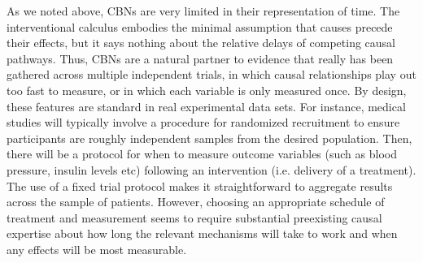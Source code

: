 \documentclass{cambridge7A}%
\begin{document}
As we noted above, CBNs are very limited in their representation of time.  The interventional calculus embodies the minimal assumption that causes precede their effects, but it says nothing about the relative delays of competing causal pathways. %
Thus, CBNs are a natural partner to evidence that really has been gathered across multiple independent trials, in which causal relationships play out too fast to measure, or in which each variable is only measured once.  By design, these features are standard in real experimental data sets.  For instance, medical studies will typically involve a procedure for randomized recruitment to ensure participants are roughly independent samples from the desired population.  Then, there will be a protocol for when to measure outcome variables (such as blood pressure, insulin levels etc) following an intervention (i.e. delivery of a treatment).  The use of a fixed trial protocol makes it straightforward to aggregate results across the sample of patients.  However, choosing an appropriate schedule of treatment and measurement seems to require substantial preexisting causal expertise about how long the relevant mechanisms will take to work and when any effects will be most measurable.  %
\end{document}
